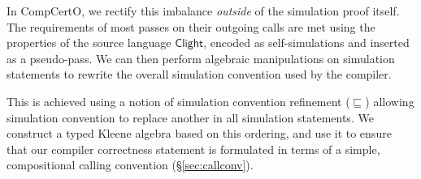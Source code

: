 \documentclass[sigplan,screen,review]{acmart}
\newcommand{\kw}[1]{\ensuremath{ \mathsf{#1} }}
\newcommand{\screfd}{\sqsubseteq}
\begin{document}

In CompCertO,
we rectify this imbalance \emph{outside}
of the simulation proof itself.
The requirements of most passes
on their outgoing calls
are met using the properties
of the source language $\kw{Clight}$,
encoded as self-simulations
and inserted as a pseudo-pass.
We can then perform algebraic manipulations
on simulation statements
to rewrite the overall simulation convention
used by the compiler.

This is achieved using a notion of
simulation convention refinement ($\screfd$)
allowing simulation convention
to replace another in all simulation statements.
We construct a typed Kleene algebra \cite{tka}
based on this ordering,
and use it to ensure that
our compiler correctness statement
is formulated in terms of a simple,
compositional calling convention (\S\ref{sec:callconv}).

\end{document}

